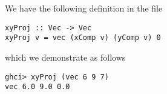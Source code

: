 
We have the following definition in the file 
\scriptsize\begin{verbatim}
xyProj :: Vec -> Vec
xyProj v = vec (xComp v) (yComp v) 0
\end{verbatim}\normalsize
which we demonstrate as follows
\scriptsize\begin{verbatim}
ghci> xyProj (vec 6 9 7)
vec 6.0 9.0 0.0
\end{verbatim}\normalsize
